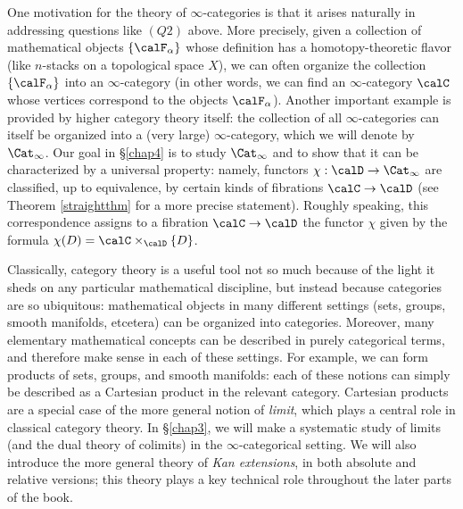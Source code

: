 One motivation for the theory of $\infty$-categories is that it arises naturally in addressing questions like $(Q2)$ above. More precisely, given a collection of mathematical objects $\{ \calF_{\alpha} \}$ whose definition has a homotopy-theoretic flavor (like $n$-stacks on a topological space $X$), we can often organize the collection $\{ \calF_{\alpha} \}$ into an $\infty$-category
(in other words, we can find an $\infty$-category $\calC$ whose vertices correspond to the
objects $\calF_{\alpha}$). Another important example is provided by higher category theory itself: 
the collection of all $\infty$-categories can itself be organized into a (very large) $\infty$-category, which we will denote by $\Cat_{\infty}$. Our goal in \S \ref{chap4} is to study $\Cat_{\infty}$ and to show that it can be characterized by a universal property: namely, functors $\chi: \calD \rightarrow \Cat_{\infty}$ are classified, up to equivalence, by certain kinds of fibrations $\calC \rightarrow \calD$ (see Theorem \ref{straightthm} for a more precise statement). Roughly speaking, this correspondence assigns to a fibration
$\calC \rightarrow \calD$ the functor $\chi$ given by the formula $\chi(D) = \calC \times_{\calD} \{D\}$. 

Classically, category theory is a useful tool not so much because of the light it sheds on any particular
mathematical discipline, but instead because categories are so ubiquitous:
mathematical objects in many different settings (sets, groups, smooth manifolds, etcetera) can be organized into categories. Moreover, many elementary mathematical concepts can be described in purely categorical terms, and therefore make sense in each of these settings. For example, we can form products of sets, groups, and smooth manifolds: each of these notions can simply be described as a Cartesian product in the relevant category. Cartesian products are a special case of the more general notion of {\em limit}, which plays a central role in classical category theory. In \S \ref{chap3}, we will make a systematic study of limits (and the dual theory of colimits) in the $\infty$-categorical setting. We will also introduce the more general theory of {\em Kan extensions}, in both absolute and relative versions; this theory plays a key technical role throughout the later parts of the book.

